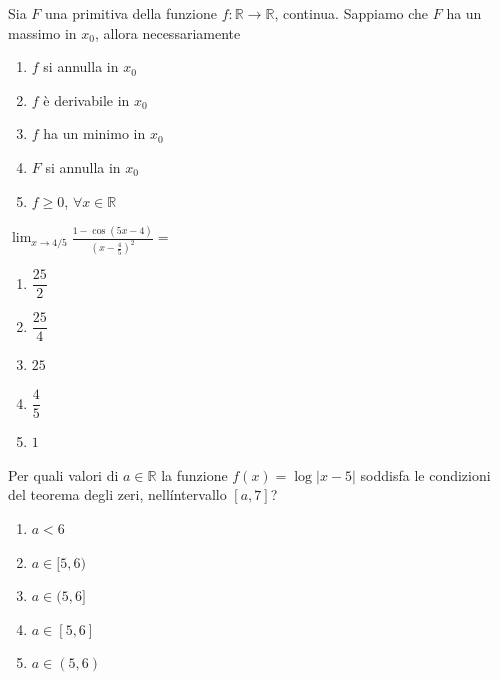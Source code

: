 \begin{quiz}
Sia $F$ una primitiva della funzione $f:\mathbb R\to\mathbb R$, continua. Sappiamo che $F$ ha un massimo in $x_0$, allora necessariamente
\begin{enumerate}
\item $f$ si annulla in $x_0$
\item $f$ \`e derivabile in $x_0$
\item $f$ ha un minimo in $x_0$
\item $F$ si annulla in $x_0$
\item $f\ge0$, $\forall x\in\mathbb R$
\end{enumerate}
\end{quiz}

\begin{quiz}
$\displaystyle\lim_{x\to4/5}\frac{1-\cos(5x-4)}{(x-\frac45)^2}=$
\begin{enumerate}
\item $\dfrac{25}{2}$
\item $\dfrac{25}{4}$
\item $25$
\item $\dfrac45$
\item $1$
\end{enumerate}
\end{quiz}

\begin{quiz}
Per quali valori di $a\in\mathbb R$ la funzione $f(x)=\log|x-5|$ soddisfa le condizioni del teorema degli zeri, nell\'intervallo $[a,7]$?
\begin{enumerate}
\item $a<6$
\item $a\in[5,6)$
\item $a\in(5,6]$
\item $a\in[5,6]$
\item $a\in(5,6)$
\end{enumerate}
\end{quiz}

